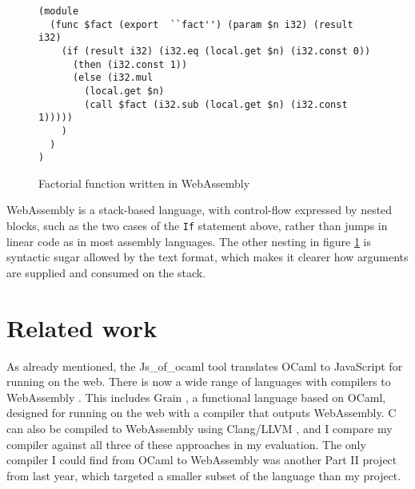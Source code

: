 \begin{figure}[H]
\begin{verbatim}
(module
  (func $fact (export  ``fact'') (param $n i32) (result i32)
    (if (result i32) (i32.eq (local.get $n) (i32.const 0))
      (then (i32.const 1))
      (else (i32.mul 
        (local.get $n) 
        (call $fact (i32.sub (local.get $n) (i32.const 1)))))
    )
  )
)
\end{verbatim}
\caption{Factorial function written in WebAssembly} 
\label{fig:wasm}
\end{figure}

WebAssembly is a stack-based language, with control-flow expressed by nested blocks, such as the two cases of the \verb|If| statement above, rather than jumps in linear code as in most assembly languages. The other nesting in figure \ref{fig:wasm} is syntactic sugar allowed by the text format, which makes it clearer how arguments are supplied and consumed on the stack.


\section{Related work}
As already mentioned, the Js\_of\_ocaml tool translates OCaml to JavaScript for running on the web. There is now a wide range of languages with compilers to WebAssembly \cite{langauges-to-wasm}. This includes Grain \cite{grain}, a functional language based on OCaml, designed for running on the web with a compiler that outputs WebAssembly. C can also be compiled to WebAssembly using Clang/LLVM \cite{clang-llvm}, and I compare my compiler against all three of these approaches in my evaluation.
The only compiler I could find from OCaml to WebAssembly was another Part II project from last year, which targeted a smaller subset of the language than my project.


